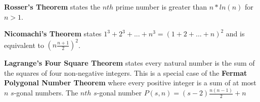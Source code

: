 
\hrulefill

\textbf{Rosser's Theorem} states the $nth$ prime number is greater than $n * ln(n)$ for $n > 1$.

\hrulefill

\textbf{Nicomachi's Theorem} states $1^3+2^3+...+n^3 = (1+2+...+n)^2$ and is equivalent to $(n \frac{n+1}{2})^2$.

\hrulefill

\textbf{Lagrange's Four Square Theorem} states every natural number is the sum of the squares of four non-negative integers. This is a special case of the \textbf{Fermat Polygonal Number Theorem} where every positive integer is a sum of at most $n$ $s$-gonal numbers. The $nth$ $s$-gonal number $P(s,n) = (s-2)\frac{n(n-1)}{2}+n$
